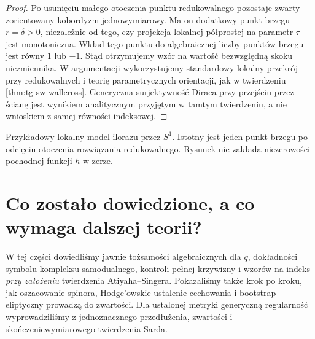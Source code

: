 \begin{proof}
Po usunięciu małego otoczenia punktu
redukowalnego pozostaje zwarty zorientowany
kobordyzm jednowymiarowy. Ma on dodatkowy
punkt brzegu $r=\delta>0$, niezależnie od
tego, czy projekcja lokalnej półprostej na
parametr $\tau$ jest monotoniczna.
Wkład tego punktu do algebraicznej liczby
punktów brzegu jest równy $1$ lub $-1$.
Stąd otrzymujemy wzór na wartość
bezwzględną skoku niezmiennika.
W argumentacji wykorzystujemy standardowy
lokalny przekrój przy redukowalnych i teorię
parametrycznych orientacji, jak w twierdzeniu
\ref{thm:tg-sw-wallcross}. Generyczna
surjektywność Diraca przy przejściu przez
ścianę jest wynikiem analitycznym przyjętym
w tamtym twierdzeniu, a nie wnioskiem
z samej równości indeksowej.
\end{proof}

\begin{center}

{\footnotesize Przykładowy lokalny model ilorazu przez $S^1$.
Istotny jest jeden punkt brzegu po odcięciu otoczenia
rozwiązania redukowalnego. Rysunek nie zakłada
niezerowości pochodnej funkcji $h$ w zerze.}
\end{center}

\section{Co zostało dowiedzione, a co wymaga dalszej teorii?}
\label{sec:tg-sw12-scope}

W tej części dowiedliśmy jawnie tożsamości algebraicznych
dla $q$, dokładności symbolu kompleksu samodualnego,
kontroli pełnej krzywizny i wzorów na indeks
\emph{przy założeniu} twierdzenia Atiyaha--Singera.
Pokazaliśmy także krok po kroku, jak oszacowanie spinora,
Hodge'owskie ustalenie cechowania i bootstrap eliptyczny
prowadzą do zwartości. Dla ustalonej metryki generyczną regularność
wyprowadziliśmy z jednoznacznego przedłużenia,
zwartości i skończeniewymiarowego twierdzenia Sarda.

